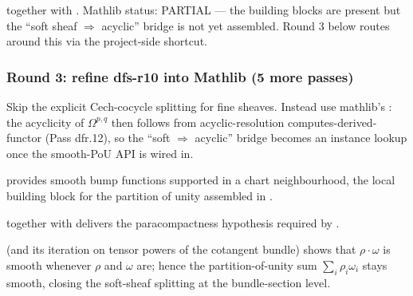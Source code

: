 \begin{lemma}
\label{lem:dfs-r10}
 together with .  Mathlib status: PARTIAL --- the building blocks are present but the ``soft sheaf $\Rightarrow$ acyclic'' bridge is not yet assembled.  Round 3 below routes around this via the project-side shortcut.
\leanok
\end{lemma}

\subsubsection*{Round 3: refine dfs-r10 into Mathlib (5 more passes)}

\begin{lemma}
\label{lem:dfs-r11}
Skip the explicit Cech-cocycle splitting for fine sheaves.  Instead use mathlib's : the acyclicity of $\Omega^{p,q}$ then follows from acyclic-resolution computes-derived-functor (Pass dfr.12), so the ``soft $\Rightarrow$ acyclic'' bridge becomes an instance lookup once the smooth-PoU API is wired in.
\leanok\mathlibok
\end{lemma}

\begin{lemma}
\label{lem:dfs-r12}
 provides smooth bump functions supported in a chart neighbourhood, the local building block for the partition of unity assembled in .
\leanok\mathlibok
\end{lemma}

\begin{lemma}
\label{lem:dfs-r13}
 together with  delivers the paracompactness hypothesis required by .
\leanok\mathlibok
\end{lemma}

\begin{lemma}
\label{lem:dfs-r14}
 (and its iteration on tensor powers of the cotangent bundle) shows that $\rho \cdot \omega$ is smooth whenever $\rho$ and $\omega$ are; hence the partition-of-unity sum $\sum_{i} \rho_{i} \omega_{i}$ stays smooth, closing the soft-sheaf splitting at the bundle-section level.
\leanok\mathlibok
\end{lemma}

